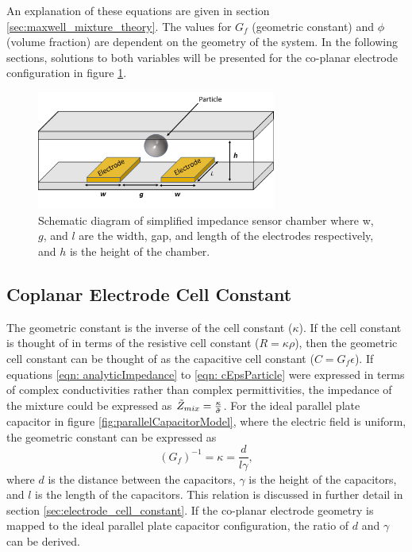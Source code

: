 \par An explanation of these equations are given in section \ref{sec:maxwell_mixture_theory}. The values for $G_f$ (geometric constant) and $\phi$ (volume fraction) are dependent on the geometry of the system. In the following sections, solutions to both variables will be presented for the co-planar electrode configuration in figure \ref{fig:simplified_IS_models}.


 \begin{figure}[ht]
 \centering
 \includegraphics[width=0.7\textwidth]{images/cellAndElectrodes.png}
 \caption[Schematic diagram of simplified impedance sensor chamber.]{Schematic diagram of simplified impedance sensor chamber where w, $g$, and $l$ are the width, gap, and length of the electrodes respectively, and $h$ is the height of the chamber.}
 \label{fig:simplified_IS_models}
 \end{figure}


\subsection{Coplanar Electrode Cell Constant}
\label{sec: coplanarElectrodeCellConstant}
    \par The geometric constant is the inverse of the cell constant ($\kappa$). If the cell constant is thought of in terms of the resistive cell constant ($R=\kappa\rho$), then the geometric cell constant can be thought of as the capacitive cell constant ($C=G_f\epsilon$). If equations \ref{eqn: analyticImpedance} to \ref{eqn: cEpsParticle} were expressed in terms of complex conductivities rather than complex permittivities, the impedance of the mixture could be expressed as $\Tilde{Z}_{mix}=\frac{\kappa}{\Tilde{\sigma}}$. For the ideal parallel plate capacitor in figure \ref{fig:parallelCapacitorModel}, where the electric field is uniform, the geometric constant can be expressed as
    \begin{equation}
        (G_f)^{-1} = \kappa = \frac{d}{l\gamma},
        \label{eqn: cellConstants}
    \end{equation}
    \noindent where $d$ is the distance between the capacitors, $\gamma$ is the height of the capacitors, and $l$ is the length of the capacitors. This relation is discussed in further detail in section \ref{sec:electrode_cell_constant}. If the co-planar electrode geometry is mapped to the ideal parallel plate capacitor configuration, the ratio of $d$ and $\gamma$ can be derived. 

